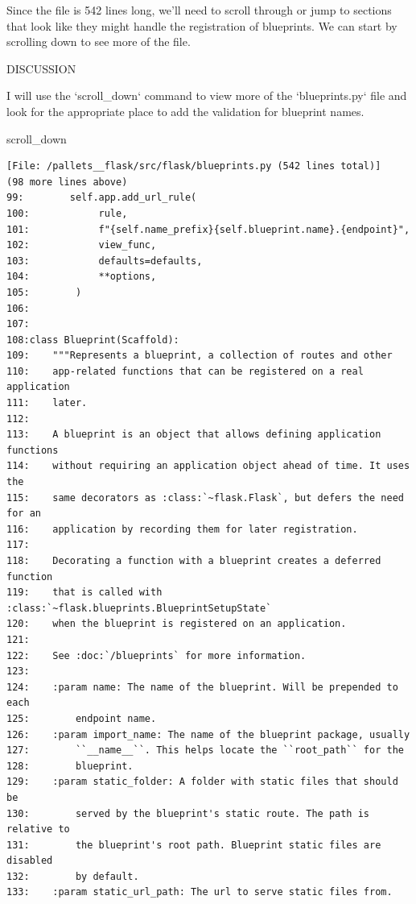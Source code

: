 {\begin{agentbox}
Since the file is 542 lines long, we'll need to scroll through or jump to sections that look like they might handle the registration of blueprints. We can start by scrolling down to see more of the file.



DISCUSSION

I will use the `scroll\_down` command to view more of the `blueprints.py` file and look for the appropriate place to add the validation for blueprint names.



\hrulefill
\begin{CodeVerbatim}[breaklines=true, breakanywhere=true]
scroll_down
\end{CodeVerbatim}
\end{agentbox}
\begin{observationbox}\begin{Verbatim}[breaklines=true, breakanywhere=true]
[File: /pallets__flask/src/flask/blueprints.py (542 lines total)]
(98 more lines above)
99:        self.app.add_url_rule(
100:            rule,
101:            f"{self.name_prefix}{self.blueprint.name}.{endpoint}",
102:            view_func,
103:            defaults=defaults,
104:            **options,
105:        )
106:
107:
108:class Blueprint(Scaffold):
109:    """Represents a blueprint, a collection of routes and other
110:    app-related functions that can be registered on a real application
111:    later.
112:
113:    A blueprint is an object that allows defining application functions
114:    without requiring an application object ahead of time. It uses the
115:    same decorators as :class:`~flask.Flask`, but defers the need for an
116:    application by recording them for later registration.
117:
118:    Decorating a function with a blueprint creates a deferred function
119:    that is called with :class:`~flask.blueprints.BlueprintSetupState`
120:    when the blueprint is registered on an application.
121:
122:    See :doc:`/blueprints` for more information.
123:
124:    :param name: The name of the blueprint. Will be prepended to each
125:        endpoint name.
126:    :param import_name: The name of the blueprint package, usually
127:        ``__name__``. This helps locate the ``root_path`` for the
128:        blueprint.
129:    :param static_folder: A folder with static files that should be
130:        served by the blueprint's static route. The path is relative to
131:        the blueprint's root path. Blueprint static files are disabled
132:        by default.
133:    :param static_url_path: The url to serve static files from.

\end{Verbatim}
\end{observationbox}}
